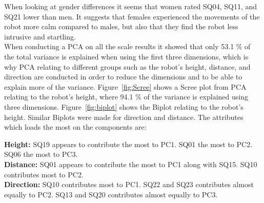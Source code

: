 When looking at gender differences it seems that women rated SQ04, SQ11, and SQ21 lower than men. It suggests that females experienced the movements of the robot more calm compared to males, but also that they find the robot less intrusive and startling.\\
When conducting a PCA on all the scale results it showed that only 53.1 \% of the total variance is explained when using the first three dimensions, which is why PCA relating to different groups such as the robot's height, distance, and direction are conducted in order to reduce the dimensions and to be able to explain more of the variance. Figure~\ref{fig:Scree} shows a Scree plot from PCA relating to the robot's height, where 94.1 \% of the variance is explained using three dimensions. Figure~\ref{fig:biplot} shows the Biplot relating to the robot's height. Similar Biplots were made for direction and distance. The attributes which loads the most on the components are:

\noindent
\textbf{Height:} SQ19 appears to contribute the most to PC1. SQ01 the most to PC2. SQ06 the most to PC3. \\
\textbf{Distance:} SQ01 appears to contribute the most to PC1 along with SQ15. SQ10 contributes most to PC2.\\
\textbf{Direction:} SQ10 contributes most to PC1. SQ22 and SQ23 contributes almost equally to PC2. SQ13 and SQ20 contributes almost equally to PC3.\\
%


